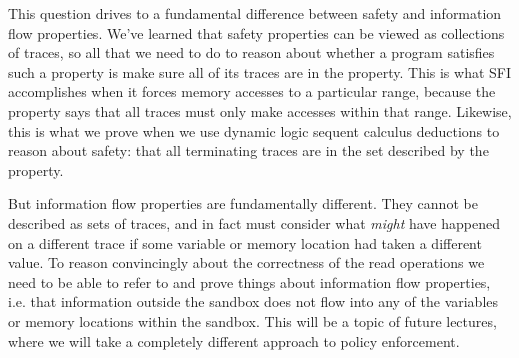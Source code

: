 \documentclass[11pt,twoside]{scrartcl}
\begin{document}
This question drives to a fundamental difference between safety and information flow properties. We've learned that safety properties can be viewed as collections of traces, so all that we need to do to reason about whether a program satisfies such a property is make sure all of its traces are in the property. This is what SFI accomplishes when it forces memory accesses to a particular range, because the property says that all traces must only make accesses within that range. Likewise, this is what we prove when we use dynamic logic sequent calculus deductions to reason about safety: that all terminating traces are in the set described by the property.

But information flow properties are fundamentally different. They cannot be described as sets of traces, and in fact must consider what \emph{might} have happened on a different trace if some variable or memory location had taken a different value. To reason convincingly about the correctness of the read operations we need to be able to refer to and prove things about information flow properties, i.e. that information outside the sandbox does not flow into any of the variables or memory locations within the sandbox. This will be a topic of future lectures, where we will take a completely different approach to policy enforcement.
\end{document}
